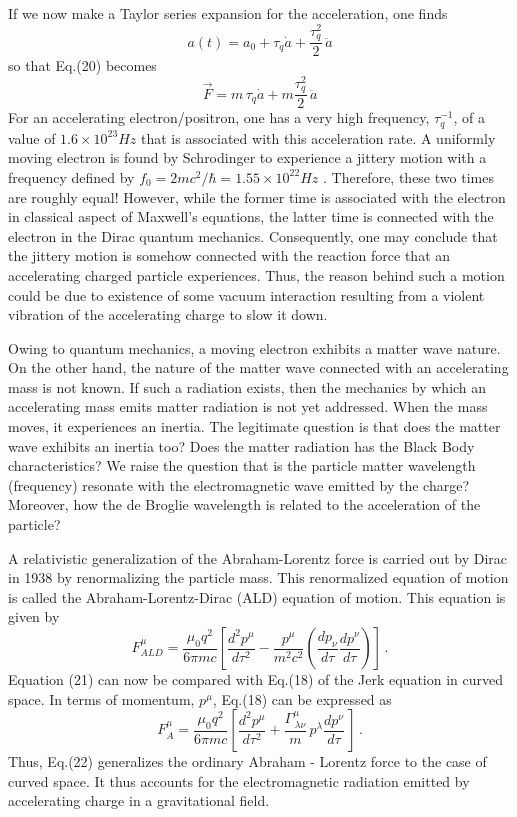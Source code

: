 \documentclass[a4]{epl2}
\begin{document}
If we now make a Taylor series expansion for the  acceleration, one finds
$$ a(t)=a_0+\tau_q\dot a+\frac{\tau_q^2}{2}\,\ddot a$$
so that Eq.(20) becomes
$$\vec{F}=m\,\tau_q\dot a+m\frac{\tau_q^2}{2}\,\ddot a $$
For an accelerating electron/positron, one has a very high frequency, $\tau_q^{-1} $, of a value of $1.6\times 10^{23}Hz$ that is associated with this acceleration rate.  A uniformly moving electron is found by Schrodinger to experience a jittery motion with a frequency defined by  $f_0=2mc^2/\hbar=1.55\times 10^{22}Hz$ \textcolor[rgb]{0.00,0.07,1.00}{\cite{schrod}}. Therefore, these two times are roughly equal! However, while the former time is associated with the electron in classical aspect of Maxwell's equations, the latter time is connected with the electron in the  Dirac quantum mechanics. Consequently, one may conclude that the jittery motion is somehow connected with the reaction force that an accelerating charged  particle experiences. Thus, the reason behind such a motion could be due to existence of some vacuum interaction resulting from a violent vibration of the accelerating charge to slow it down.


Owing to  quantum mechanics, a moving electron exhibits a matter wave nature. On the other hand, the nature of the matter wave connected with an accelerating mass is not known. If such a radiation exists, then the mechanics by which an accelerating mass emits matter radiation is not yet addressed. When the mass moves, it experiences an inertia. The legitimate question is that does the matter wave exhibits an inertia too? Does the matter radiation has the Black Body characteristics? We raise the question that is the particle matter wavelength (frequency) resonate with the electromagnetic wave emitted by the charge? Moreover, how the de Broglie wavelength is related to the acceleration of the particle?

A relativistic generalization of the Abraham-Lorentz force is carried out by Dirac in 1938 by renormalizing the particle mass. This renormalized equation of motion is called the Abraham-Lorentz-Dirac (ALD) equation of motion. This equation is given by \textcolor[rgb]{0.00,0.07,1.00}{\cite{abraham,lorentz,dirac}}
\begin{equation}
F^\mu_{ALD}=\frac{\mu_0q^2}{6\pi mc}\left[\frac{d^2p^\mu}{d\tau^2}-\frac{p^\mu}{m^2c^2}\left(\frac{dp_\nu}{d\tau}\frac{dp^\nu}{d\tau}\right)\right]\,.
\end{equation}
Equation (21) can now be compared with Eq.(18) of the Jerk equation in curved space. In terms of momentum, $p^\mu$, Eq.(18) can be expressed as
\begin{equation}
F^\mu_A=\frac{\mu_0 q^2}{6\pi mc}\left[\frac{d^2p^\mu}{d\tau^2}+\frac{\Gamma ^\mu_{\,\lambda\nu}}{m}\, p^\lambda\frac{dp^\nu}{d\tau}\,\right]\,.
\end{equation}
Thus, Eq.(22) generalizes the ordinary Abraham - Lorentz force to the case of curved space. It thus  accounts for the electromagnetic radiation emitted by accelerating charge in a gravitational field.
\end{document}
